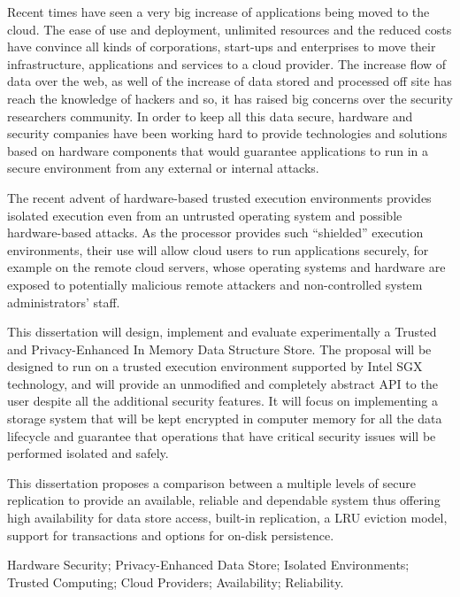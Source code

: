 Recent times have seen a very big increase of applications being moved to the cloud. The ease of use and deployment, unlimited resources and the reduced costs have convince all kinds of corporations, start-ups and enterprises to move their infrastructure, applications and services to a cloud provider. The increase flow of data over the web, as well of the increase of data stored and processed off site has reach the knowledge of hackers and so, it has raised big concerns over the security researchers community. In order to keep all this data secure, hardware and security companies have been working hard to provide technologies and solutions based on hardware components that would guarantee applications to run in a secure environment from any external or internal attacks.

The recent advent of hardware-based trusted execution environments provides isolated execution even from an untrusted operating system and possible hardware-based attacks. As the processor provides such “shielded” execution environments, their use will allow cloud users to run applications securely, for example on the remote cloud servers, whose operating systems and hardware are exposed to potentially malicious remote attackers and non-controlled system administrators’ staff.

This dissertation will design, implement and evaluate experimentally a Trusted and Privacy-Enhanced In Memory Data Structure Store. The proposal will be designed to run on a trusted execution environment supported by Intel SGX technology, and will provide an unmodified and completely abstract API to the user despite all the additional security features. It will focus on implementing a storage system that will be kept encrypted in computer memory for all the data lifecycle and guarantee that operations that have critical security issues will be performed isolated and safely.

This dissertation proposes a comparison between a multiple levels of secure replication to provide an available, reliable and dependable system thus offering high availability for data store access, built-in replication, a LRU eviction model, support for transactions and options for on-disk persistence.

\begin{keywords}
Hardware Security; Privacy-Enhanced Data Store; Isolated Environments; Trusted Computing; Cloud Providers; Availability; Reliability.
\end{keywords} 

